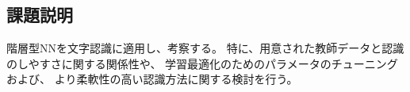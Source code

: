 \subsection{課題説明}
階層型NNを文字認識に適用し、考察する。
特に、用意された教師データと認識のしやすさに関する関係性や、
学習最適化のためのパラメータのチューニングおよび、
より柔軟性の高い認識方法に関する検討を行う。

